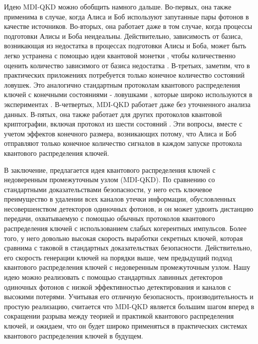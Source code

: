 Идею MDI-QKD можно обобщить намного дальше. Во-первых, она также применима в случае, когда Алиса и Боб используют запутанные пары фотонов в качестве источников. Во-вторых, она работает даже в том случае, когда процессы подготовки Алисы и Боба неидеальны. Действительно, зависимость от базиса, возникающая из недостатка в процессах подготовки Алисы и Боба, может быть легко устранена с помощью идеи квантовой монетки \cite{gottesman2004,koashi2005}, чтобы количественно оценить количество зависимого от базиса недостатка \cite{tamaki2012}. В-третьих, заметим, что в практических приложениях потребуется только конечное количество состояний ловушек. Это аналогично стандартным протоколам квантового распределения ключей с конечными состояниями - ловушками \cite{ma2005}, которые широко используются в экспериментах \cite{rosenberg2009}. В-четвертых, MDI-QKD работает даже без уточненного анализа данных. В-пятых, она также работает для других протоколов квантовой криптографии, включая протокол из шести состояний \cite{fuchs1997}. Эти вопросы, вместе с учетом эффектов конечного размера, возникающих потому, что Алиса и Боб отправляют только конечное количество сигналов в каждом запуске протокола квантового распределения ключей\cite{tamaki2012}.

В заключение, предлагается идея квантового распределения ключей с недоверенным промежуточным узлом (MDI-QKD). По сравнению со стандартными доказательствами безопасности, у него есть ключевое преимущество в удалении всех каналов утечки информации, обусловленных несовершенством детекторов одиночных фотонов, и он может удвоить дистанцию передачи, охватываемую с помощью обычных протоколов квантового распределения ключей с использованием слабых когерентных импульсов. Более того, у него довольно высокая скорость выработки секретных ключей, которая сравнима с таковой в стандартных доказательствах безопасности. Действительно, его скорость генерации ключей на порядки выше, чем предыдущий подход  квантового распределения ключей с недоверенным промежуточным узлом. Нашу идею можно реализовать с помощью стандартных лавинных детекторов одиночных фотонов с низкой эффективностью детектирования и каналов с высокими потерями. Учитывая его отличную безопасность, производительность и простую реализацию, считается что MDI-QKD является большим шагом вперед в сокращении разрыва между теорией и практикой квантового распределения ключей, и ожидаем, что он будет широко применяться в практических системах квантового распределения ключей в будущем.
